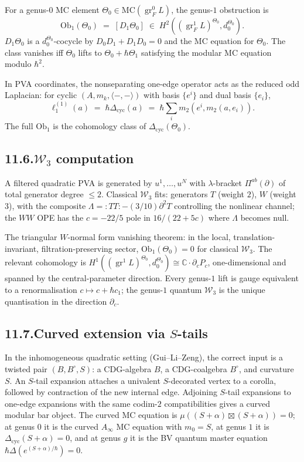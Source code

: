 \documentclass[11pt]{report}
\theoremstyle{definition}
\theoremstyle{remark}
\providecommand{\cW}{\mathcal{W}}
\providecommand{\MC}{\mathrm{MC}}
\providecommand{\Ob}{\mathrm{Ob}}
\providecommand{\bC}{\mathbb{C}}
\DeclareMathOperator{\gr}{gr}
\numberwithin{equation}{section}
\begin{document}
For a genus-$0$ MC element
$\Theta_0 \in \MC(\gr_F^0 L)$, the genus-$1$ obstruction is
\[
\Ob_1(\Theta_0)
\;=\;
[D_1 \Theta_0]
\;\in\;
H^2((\gr_F^1 L)^{\Theta_0}, d_0^{\Theta_0}).
\]
$D_1\Theta_0$ is a $d_0^{\Theta_0}$-cocycle by
$D_0 D_1 + D_1 D_0 = 0$ and the MC equation for $\Theta_0$.
The class vanishes iff $\Theta_0$ lifts to
$\Theta_0 + \hbar\Theta_1$ satisfying the modular MC equation
modulo $\hbar^2$.

In PVA coordinates, the nonseparating one-edge operator acts
as the reduced odd Laplacian: for cyclic $(A, m_k, \langle-,-\rangle)$
with basis $\{e^i\}$ and dual basis $\{e_i\}$,
\[
\ell_1^{(1)}(a)
\;=\;
\hbar\Delta_{\mathrm{cyc}}(a)
\;=\;
\hbar\sum_i m_2(e^i, m_2(a, e_i)).
\]
The full $\Ob_1$ is the cohomology class of
$\Delta_{\mathrm{cyc}}(\Theta_0)$.

\subsection*{11.6.\enspace $\cW_3$ computation}

A filtered quadratic PVA is generated by $u^1, \ldots, u^N$ with
$\lambda$-bracket $\Pi^{ab}(\partial)$ of total generator degree
$\le 2$. Classical $\cW_3$ fits: generators $T$ (weight $2$),
$W$ (weight $3$), with the composite
$\Lambda = :TT: - (3/10)\partial^2 T$ controlling the nonlinear
channel; the $WW$ OPE has the $c = -22/5$ pole in
$16/(22 + 5c)$ where $\Lambda$ becomes null.

The triangular $W$-normal form vanishing theorem: in the local,
translation-invariant, filtration-preserving sector,
$\Ob_1(\Theta_0) = 0$ for classical $\cW_3$. The relevant
cohomology is
$H^1((\gr^1 L)^{\Theta_0}, d_0^{\Theta_0})
\cong \bC\cdot\partial_c P_c$,
one-dimensional and spanned by the central-parameter direction.
Every genus-$1$ lift is gauge equivalent to a renormalisation
$c \mapsto c + \hbar c_1$; the genus-$1$ quantum $\cW_3$ is the
unique quantisation in the direction $\partial_c$.

\subsection*{11.7.\enspace Curved extension via $S$-tails}

In the inhomogeneous quadratic setting (Gui--Li--Zeng), the
correct input is a twisted pair $(B, B^\circ, S)$: a
CDG-algebra $B$, a CDG-coalgebra $B^\circ$, and curvature $S$.
An $S$-tail expansion attaches a univalent $S$-decorated vertex
to a corolla, followed by contraction of the new internal edge.
Adjoining $S$-tail expansions to one-edge expansions with the
same codim-$2$ compatibilities gives a curved modular bar
object. The curved MC equation is
$\mu((S + \alpha) \boxtimes (S + \alpha)) = 0$; at genus $0$
it is the curved $A_\infty$ MC equation with $m_0 = S$, at
genus $1$ it is $\Delta_{\mathrm{cyc}}(S + \alpha) = 0$, and
at genus $g$ it is the BV quantum master equation
$\hbar\Delta(e^{(S+\alpha)/\hbar}) = 0$.
\end{document}
